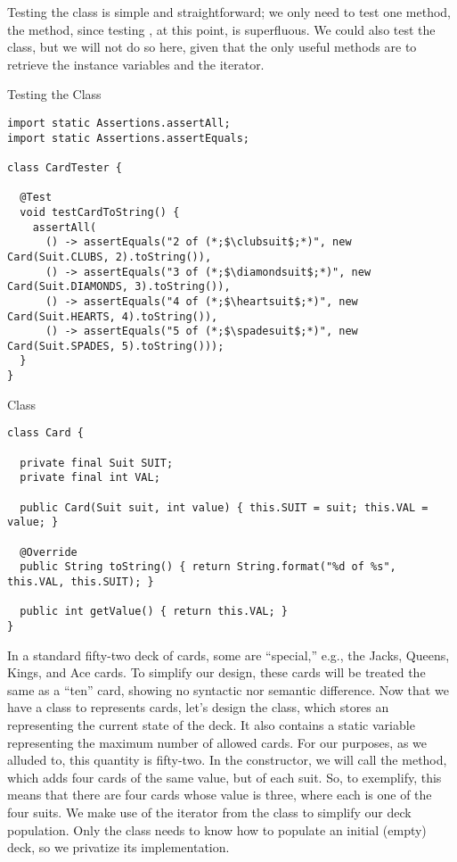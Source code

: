 Testing the  class is simple and straightforward; we only need to test one method, the  method, since testing , at this point, is superfluous. We could also test the  class, but we will not do so here, given that the only useful methods are to retrieve the instance variables and the iterator.

\begin{cl}{Testing the  Class}
\begin{lstlisting}[language=MyJava]
import static Assertions.assertAll;
import static Assertions.assertEquals;

class CardTester {

  @Test
  void testCardToString() {
    assertAll(
      () -> assertEquals("2 of (*;$\clubsuit$;*)", new Card(Suit.CLUBS, 2).toString()),
      () -> assertEquals("3 of (*;$\diamondsuit$;*)", new Card(Suit.DIAMONDS, 3).toString()),
      () -> assertEquals("4 of (*;$\heartsuit$;*)", new Card(Suit.HEARTS, 4).toString()),
      () -> assertEquals("5 of (*;$\spadesuit$;*)", new Card(Suit.SPADES, 5).toString()));
  }
}
\end{lstlisting}
\end{cl}

\begin{cl}{ Class}
\begin{lstlisting}[language=MyJava]
class Card {

  private final Suit SUIT;
  private final int VAL;

  public Card(Suit suit, int value) { this.SUIT = suit; this.VAL = value; }
  
  @Override
  public String toString() { return String.format("%d of %s", this.VAL, this.SUIT); }

  public int getValue() { return this.VAL; } 
}
\end{lstlisting}
\end{cl}

In a standard fifty-two deck of cards, some are ``special,'' e.g., the Jacks, Queens, Kings, and Ace cards. To simplify our design, these cards will be treated the same as a ``ten'' card, showing no syntactic nor semantic difference. Now that we have a class to represents cards, let's design the  class, which stores an  representing the current state of the deck. It also contains a static variable representing the maximum number of allowed cards. For our purposes, as we alluded to, this quantity is fifty-two. In the  constructor, we will call the  method, which adds four cards of the same value, but of each suit. So, to exemplify, this means that there are four cards whose value is three, where each is one of the four suits. We make use of the iterator from the  class to simplify our deck population. Only the  class needs to know how to populate an initial (empty) deck, so we privatize its implementation.

